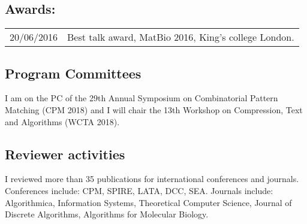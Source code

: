 \documentclass{article}
\begin{document}
\subsection*{Awards:}
\begin{tabular}{p{2cm} p{10cm}}
	20/06/2016 & Best talk award, MatBio 2016, King's college London.\\
\end{tabular}

\subsection*{Program Committees}
I am on the PC of the 29th Annual Symposium on Combinatorial Pattern Matching (CPM 2018) and I will chair the 13th Workshop on Compression, Text and Algorithms (WCTA 2018).


\subsection*{Reviewer activities}

I reviewed more than 35 publications for international conferences and journals. Conferences include: CPM, SPIRE, LATA, DCC, SEA. Journals include: Algorithmica, Information Systems, Theoretical Computer Science, Journal of Discrete Algorithms, Algorithms for Molecular Biology.
\end{document}
